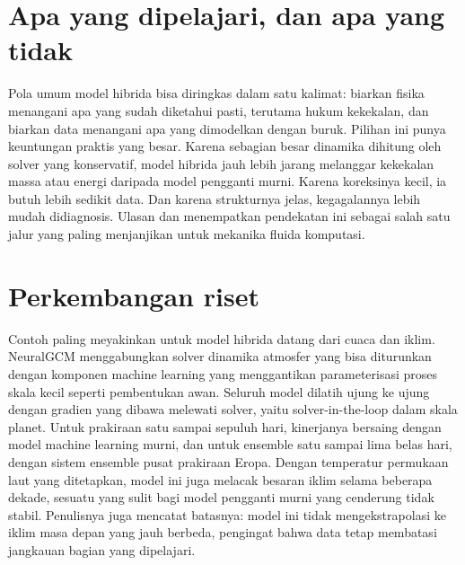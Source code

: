 \section{Apa yang dipelajari, dan apa yang tidak}

Pola umum model hibrida bisa diringkas dalam satu kalimat: biarkan fisika menangani apa yang sudah
diketahui pasti, terutama hukum kekekalan, dan biarkan data menangani apa yang dimodelkan dengan buruk.
Pilihan ini punya keuntungan praktis yang besar. Karena sebagian besar dinamika dihitung oleh solver
yang konservatif, model hibrida jauh lebih jarang melanggar kekekalan massa atau energi daripada model
pengganti murni. Karena koreksinya kecil, ia butuh lebih sedikit data. Dan karena strukturnya jelas,
kegagalannya lebih mudah didiagnosis. Ulasan \citet{vinuesa2022} dan \citet{brunton2020} menempatkan
pendekatan ini sebagai salah satu jalur yang paling menjanjikan untuk mekanika fluida komputasi.

\section{Perkembangan riset}

Contoh paling meyakinkan untuk model hibrida datang dari cuaca dan iklim. NeuralGCM \citep{kochkov2024} menggabungkan
solver dinamika atmosfer yang bisa diturunkan dengan komponen machine learning yang menggantikan parameterisasi proses
skala kecil seperti pembentukan awan. Seluruh model dilatih ujung ke ujung dengan gradien yang dibawa melewati solver,
yaitu solver-in-the-loop dalam skala planet. Untuk prakiraan satu sampai sepuluh hari, kinerjanya bersaing dengan model
machine learning murni, dan untuk ensemble satu sampai lima belas hari, dengan sistem ensemble pusat prakiraan Eropa.
Dengan temperatur permukaan laut yang ditetapkan, model ini juga melacak besaran iklim selama beberapa dekade, sesuatu
yang sulit bagi model pengganti murni yang cenderung tidak stabil. Penulisnya juga mencatat batasnya: model ini tidak
mengekstrapolasi ke iklim masa depan yang jauh berbeda, pengingat bahwa data tetap membatasi jangkauan bagian yang
dipelajari.

